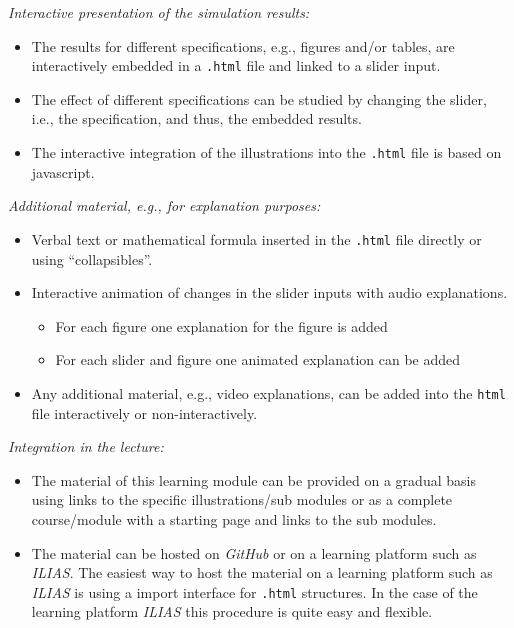 \documentclass{article}
\begin{document}
\emph{Interactive presentation of the simulation results:}

\begin{itemize}
	\item The results for different specifications, e.g., figures and/or tables, are interactively embedded in a \texttt{.html} file and linked to a slider input.
	\item The effect of different specifications can be studied by changing the slider, i.e., the specification, and thus, the embedded results.
	\item The interactive integration of the illustrations into the \texttt{.html} file is based on javascript.
\end{itemize}

\emph{Additional material, e.g., for explanation purposes:}

\begin{itemize}
	\item Verbal text or mathematical formula inserted in the \texttt{.html} file directly or using ``collapsibles''.
	\item Interactive animation of changes in the slider inputs with audio explanations.
	\begin{itemize}
		\item For each figure one explanation for the figure is added
		\item For each slider and figure one animated explanation can be added
	\end{itemize}	
	\item Any additional material, e.g., video explanations, can be added into the \texttt{html} file interactively or non-interactively.
\end{itemize}

\emph{Integration in the lecture:}

\begin{itemize}
	\item The material of this learning module can be provided on a gradual basis using links to the specific illustrations/sub modules or as a complete course/module with a starting page and links to the sub modules.
	\item The material can be hosted on \emph{GitHub} or on a learning platform such as \emph{ILIAS}. The easiest way to host the material on a learning platform such as \emph{ILIAS} is using a import interface for \texttt{.html} structures. In the case of the learning platform \emph{ILIAS} this procedure is quite easy and flexible.	
\end{itemize}
\end{document}
